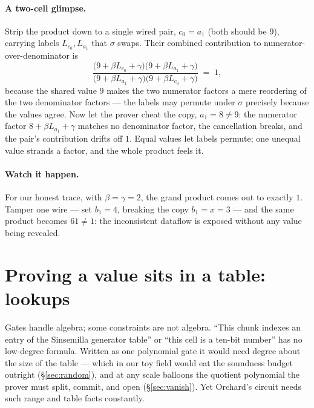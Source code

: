 \documentclass[11pt,a4paper]{article}
\theoremstyle{definition}
\begin{document}
\paragraph{A two-cell glimpse.} Strip the product down to a single wired pair,
$c_0 = a_1$ (both should be $9$), carrying labels $L_{c_0}, L_{a_1}$ that
$\sigma$ swaps. Their combined contribution to numerator-over-denominator is
\[
\frac{\bigl(9 + \beta L_{c_0} + \gamma\bigr)\bigl(9 + \beta L_{a_1} + \gamma\bigr)}
     {\bigl(9 + \beta L_{a_1} + \gamma\bigr)\bigl(9 + \beta L_{c_0} + \gamma\bigr)} \;=\; 1,
\]
because the shared value $9$ makes the two numerator factors a mere reordering
of the two denominator factors --- the labels may permute under $\sigma$
precisely because the values agree. Now let the prover cheat the copy,
$a_1 = 8 \neq 9$: the numerator factor $8 + \beta L_{a_1} + \gamma$ matches no
denominator factor, the cancellation breaks, and the pair's contribution drifts
off $1$. Equal values let labels permute; one unequal value strands a factor,
and the whole product feels it.

\paragraph{Watch it happen.} For our honest trace, with $\beta = \gamma = 2$,
the grand product comes out to exactly $1$. Tamper one wire --- set $b_1 = 4$,
breaking the copy $b_1 = x = 3$ --- and the same product becomes $61 \neq 1$:
the inconsistent dataflow is exposed without any value being revealed.

\section{Proving a value sits in a table: lookups}\label{sec:lookups}

Gates handle algebra; some constraints are not algebra. ``This chunk
indexes an entry of the Sinsemilla generator table'' or ``this cell is
a ten-bit number'' has no low-degree formula. Written as one polynomial
gate it would need degree about the size of the table --- which in our
toy field would eat the soundness budget outright (\S\ref{sec:random}),
and at any scale balloons the quotient polynomial the prover must
split, commit, and open (\S\ref{sec:vanish}). Yet Orchard's circuit
needs such range and table facts constantly.
\end{document}
